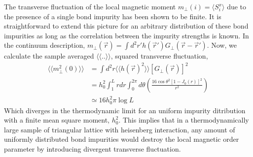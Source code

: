 \documentclass{article}
\newcommand{\vr}{\vec{r}}
\begin{document}
The transverse fluctuation of the local magnetic moment 
$m_\perp(i)=\langle S^x_i\rangle$ due to the presence of a 
single bond impurity has been shown to be finite. It is 
straightforward to extend this picture for an arbitrary
distribution of these bond impurities as long as the 
correlation between the impurity strengths is known. 
In the continuum  description, $m_\perp(\vr) = \int 
d^2r' h(\vr')G_\perp(\vr-\vr')$. Now, we calculate the 
sample averaged $\langle\langle .. \rangle\rangle$, 
squared transverse fluctuation,
\begin{equation}
    \begin{aligned}
        \langle\langle m^2_\perp(0)
        \rangle\rangle
        &=\int d^2r\langle\langle h(\vr)^2
        \rangle\rangle
        \left[G_\perp(\vr)\right]^2 \\
        &=h_0^2\int^{L}_{1} rdr
        \int^{2\pi}_0d\theta
        \left(\frac{16\cos\theta^2
            [1-J_0(r)]^2}
        {r^2}\right) \\
        &\simeq 16h_0^2\pi\log L
    \end{aligned}
\end{equation}
Which diverges in the thermodynamic limit for an uniform 
impurity ditribution with a finite mean square moment, 
$h_0^2$. This implies that in a thermodynamically 
large sample of triangular lattice with heisenberg 
interaction, any amount of uniformly distributed bond 
impurities would destroy the local magnetic order parameter 
by introducing divergent transverse fluctuation.
\end{document}
